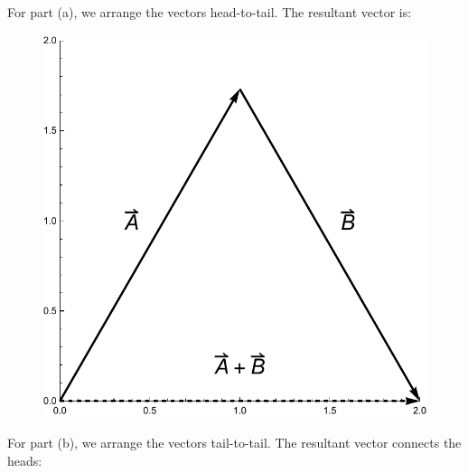 \documentclass{amsart}
\begin{document}
For part (a), we arrange the vectors head-to-tail.  The resultant vector is:

\begin{figure}[h]
\includegraphics[scale=0.32]{1-22b}
\end{figure}

\clearpage

For part (b), we arrange the vectors tail-to-tail.
The resultant vector connects the heads:
\end{document}

